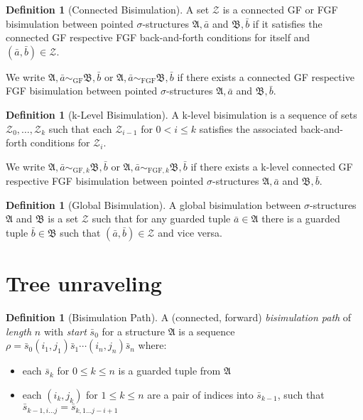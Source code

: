 \documentclass[draft]{scrartcl}
\theoremstyle{definition}
\newtheorem{definition}[theorem]{Definition}
\newcommand{\struct}[1]{$\mathfrak{#1}$}
\begin{document}
\begin{definition}[Connected Bisimulation]
A set $\mathcal{Z}$ is a connected GF or FGF bisimulation between pointed $\sigma$-structures $\mathfrak{A}, \bar{a}$ and $\mathfrak{B}, \bar{b}$ if it satisfies the connected GF respective FGF back-and-forth conditions for itself and $(\bar{a}, \bar{b}) \in \mathcal{Z}$.
\end{definition}

We write $\mathfrak{A}, \bar{a} \sim_{\textrm{GF}} \mathfrak{B}, \bar{b}$ or $\mathfrak{A}, \bar{a} \sim_{\textrm{FGF}} \mathfrak{B}, \bar{b}$ if there exists a connected GF respective FGF bisimulation between pointed $\sigma$-structures $\mathfrak{A}, \bar{a}$ and $\mathfrak{B}, \bar{b}$.

\begin{definition}[k-Level Bisimulation]
A k-level bisimulation is a sequence of sets $\mathcal{Z}_0, \ldots, \mathcal{Z}_k$ such that each $\mathcal{Z}_{i - 1}$ for $0 < i \le k$ satisfies the associated back-and-forth conditions for $\mathcal{Z}_i$.
\end{definition}

We write $\mathfrak{A}, \bar{a} \sim_{\textrm{GF}, k} \mathfrak{B}, \bar{b}$ or $\mathfrak{A}, \bar{a} \sim_{\textrm{FGF}, k} \mathfrak{B}, \bar{b}$ if there exists a k-level connected GF respective FGF bisimulation between pointed $\sigma$-structures $\mathfrak{A}, \bar{a}$ and $\mathfrak{B}, \bar{b}$.

\begin{definition}[Global Bisimulation]
A global bisimulation between $\sigma$-structures $\mathfrak{A}$ and $\mathfrak{B}$ is a set $\mathcal{Z}$ such that for any guarded tuple $\bar{a} \in \mathfrak{A}$ there is a guarded tuple $\bar{b} \in \mathfrak{B}$ such that $(\bar{a}, \bar{b}) \in \mathcal{Z}$ and vice versa.
\end{definition}

\pagebreak

\section{Tree unraveling}

\begin{definition}[Bisimulation Path]\label{def:bisim-path}
  A (connected, forward) \emph{bisimulation path} of \emph{length} $n$ with \emph{start} $\bar{s}_{0}$ for a structure \struct{A} is a sequence $\rho = \bar{s}_{0}(i_{1}, j_{1})\bar{s}_{1}\cdots{}(i_{n}, j_{n})\bar{s}_{n}$ where:
  \begin{itemize}
    \item each $\bar{s}_{k}$ for $0 \le k \le n$ is a guarded tuple from \struct{A}
    \item each $(i_{k}, j_{k})$ for $1 \le k \le n$ are a pair of indices into $\bar{s}_{k-1}$, such that $\bar{s}_{k-1,i\ldots{}j} = \bar{s}_{k,1\ldots{j-i+1}}$
  \end{itemize}
\end{definition}
\end{document}

